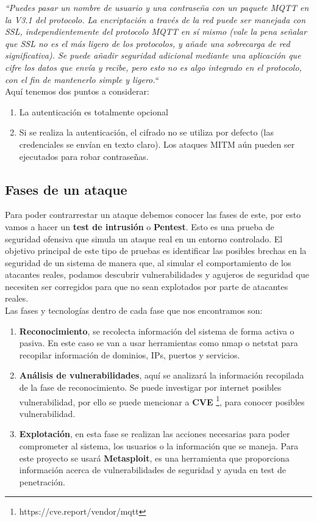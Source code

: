 \textit{``Puedes pasar un nombre de usuario y una contraseña con un paquete MQTT en la V3.1 del protocolo. La encriptación a través de la red puede ser manejada con SSL, independientemente del protocolo MQTT en sí mismo (vale la pena señalar que SSL no es el más ligero de los protocolos, y añade una sobrecarga de red significativa). Se puede añadir seguridad adicional mediante una aplicación que cifre los datos que envía y recibe, pero esto no es algo integrado en el protocolo, con el fin de mantenerlo simple y ligero.``}\\

Aquí tenemos dos puntos a considerar:

\begin{enumerate}
    \item La autenticación es totalmente opcional
    \item Si se realiza la autenticación, el cifrado no se utiliza por defecto (las credenciales se envían en texto claro). Los ataques MITM aún pueden ser ejecutados para robar contraseñas.
\end{enumerate}

\subsection{Fases de un ataque}

Para poder contrarrestar un ataque debemos conocer las fases de este, por esto vamos a hacer un \textbf{test de intrusión} o \textbf{Pentest}. Esto es una prueba de seguridad ofensiva que simula un ataque real en un entorno controlado. El objetivo principal de este tipo de pruebas es identificar las posibles brechas en la seguridad de un sistema de manera que, al simular el comportamiento de los atacantes reales, podamos descubrir vulnerabilidades y agujeros de seguridad que necesiten ser corregidos para que no sean explotados por parte de atacantes reales. \cite{pentesting} \\

Las fases y tecnologías dentro de cada fase que nos encontramos son:

\begin{enumerate}
    \item \textbf{Reconocimiento}, se recolecta información del sistema de forma activa o pasiva. En este caso se van a usar herramientas como nmap o netstat para recopilar información de dominios, IPs, puertos y servicios.
    \item \textbf{Análisis de vulnerabilidades}, aquí se analizará la información recopilada de la fase de reconocimiento. Se puede investigar por internet posibles vulnerabilidad, por ello se puede mencionar a \textbf{CVE} \footnote{https://cve.report/vendor/mqtt}, para conocer posibles vulnerabilidad.
    \item \textbf{Explotación}, en esta fase se realizan las acciones necesarias para poder comprometer al sistema, los usuarios o la información que se maneja. Para este proyecto se usará \textbf{Metasploit}, es una herramienta que proporciona información acerca de vulnerabilidades de seguridad y ayuda en test de penetración.
\end{enumerate}